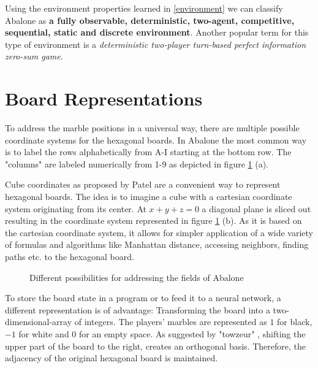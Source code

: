 Using the environment properties learned in \ref{environment} we can classify Abalone as \textbf{a fully observable, deterministic, two-agent, competitive, sequential, static and discrete environment}. Another popular term for this type of environment is a \textit{deterministic two-player  turn-based perfect information zero-sum game}.

\section{Board Representations}
\label{board_representations}

To address the marble positions in a universal way, there are multiple possible coordinate systems for the hexagonal boards. In Abalone the most common way is to label the rows alphabetically from A-I starting at the bottom row. The "columns" are labeled numerically from 1-9 as depicted in figure \ref{abalone_coordinate_systems} (a).

Cube coordinates  as proposed by Patel \cite{noauthor_red_nodate} are a convenient way to represent hexagonal boards. The idea is to imagine a cube with a cartesian coordinate system originating from its center. At $x + y + z = 0$ a diagonal plane is sliced out resulting in the coordinate system represented in figure \ref{abalone_coordinate_systems} (b). As it is based on the cartesian coordinate system, it allows for simpler application of a wide variety of formulas and algorithms like Manhattan distance, accessing neighbors, finding paths etc. to the hexagonal board.

\begin{figure}[!h]
    \centering
    \caption{Different possibilities for addressing the fields of Abalone}
    \label{abalone_coordinate_systems}
\end{figure}

To store the board state in a program or to feed it to a neural network, a different representation is of advantage: Transforming the board into a two-dimensional-array of integers. The players' marbles are represented as $1$ for black, $-1$ for white and 0 for an empty space. As suggested by "towzeur" \cite{towzeur_towzeurgym-abalone_2021}, shifting the upper part of the board to the right, creates an orthogonal basis. Therefore, the adjacency of the original hexagonal board is maintained.

